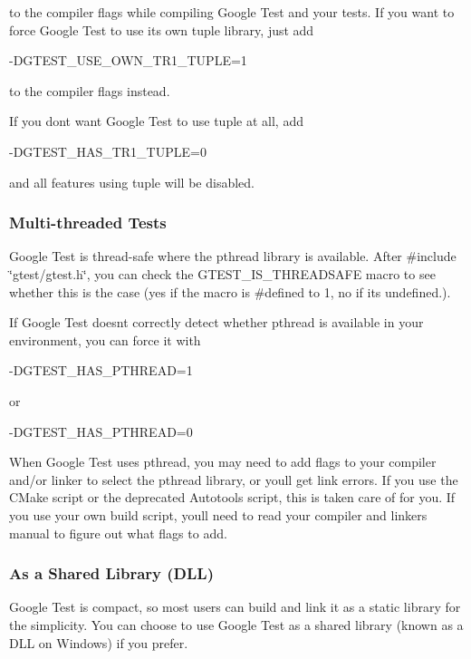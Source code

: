 to the compiler flags while compiling Google Test and your tests. If you want to force Google Test to use its own tuple library, just add \begin{DoxyVerb}-DGTEST_USE_OWN_TR1_TUPLE=1
\end{DoxyVerb}


to the compiler flags instead.

If you don\textquotesingle{}t want Google Test to use tuple at all, add \begin{DoxyVerb}-DGTEST_HAS_TR1_TUPLE=0
\end{DoxyVerb}


and all features using tuple will be disabled.

\subsubsection*{Multi-\/threaded Tests}

Google Test is thread-\/safe where the pthread library is available. After {\ttfamily \#include \char`\"{}gtest/gtest.\+h\char`\"{}}, you can check the {\ttfamily G\+T\+E\+S\+T\+\_\+\+I\+S\+\_\+\+T\+H\+R\+E\+A\+D\+S\+A\+FE} macro to see whether this is the case (yes if the macro is {\ttfamily \#defined} to 1, no if it\textquotesingle{}s undefined.).

If Google Test doesn\textquotesingle{}t correctly detect whether pthread is available in your environment, you can force it with \begin{DoxyVerb}-DGTEST_HAS_PTHREAD=1
\end{DoxyVerb}


or \begin{DoxyVerb}-DGTEST_HAS_PTHREAD=0
\end{DoxyVerb}


When Google Test uses pthread, you may need to add flags to your compiler and/or linker to select the pthread library, or you\textquotesingle{}ll get link errors. If you use the C\+Make script or the deprecated Autotools script, this is taken care of for you. If you use your own build script, you\textquotesingle{}ll need to read your compiler and linker\textquotesingle{}s manual to figure out what flags to add.

\subsubsection*{As a Shared Library (D\+LL)}

Google Test is compact, so most users can build and link it as a static library for the simplicity. You can choose to use Google Test as a shared library (known as a D\+LL on Windows) if you prefer.

